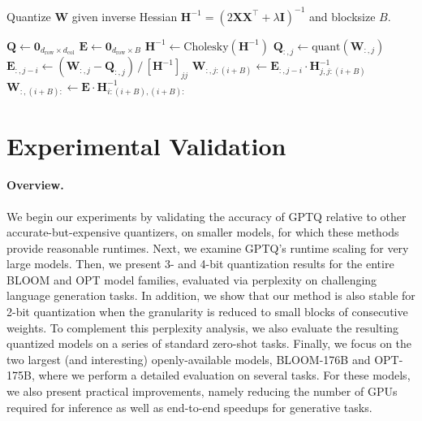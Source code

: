 \begin{algorithm}[H]
    \centering
    \caption{Quantize $\mathbf{W}$ given inverse Hessian $\mathbf{H}^{-1} = (2 \mathbf{X} \mathbf{X}^\top + \lambda \mathbf{I})^{-1}$ and blocksize $B$.}
    \small
    \label{alg:trueobs-row}
    \begin{algorithmic}
        \STATE $\mathbf{Q} \gets \mathbf{0}_{d_\text{row} \times d_\text{col}}$ \quad {}
        \STATE $\mathbf{E} \gets \mathbf{0}_{d_\text{row} \times B}$ \quad {}
        \STATE $\mathbf{H}^{-1} \gets \text{Cholesky}
        (\mathbf{H}^{-1})$ 
                \STATE $\mathbf{Q}_{:, j} \gets \text{quant}(\mathbf{W}_{:, j})$ \quad {}
                \STATE $\mathbf{E}_{:, j - i} \gets (\mathbf{W}_{:, j} - \mathbf{Q}_{:, j}) \, / \, [\mathbf{H}^{-1}]_{jj}$ 
                \STATE $\mathbf{W}_{:, j:(i + B)} \gets \mathbf{E}_{:, j - i} \cdot \mathbf{H}^{-1}_{j, j:(i + B)}$ 
            \ENDFOR
            \STATE $\mathbf{W}_{:, (i + B):} \gets \mathbf{E} \cdot \mathbf{H}^{-1}_{i:(i + B), (i + B):}$ 
        \ENDFOR
    \end{algorithmic}
\end{algorithm}

\section{Experimental Validation}
\label{sec:experiments}

\paragraph{Overview.} We begin our experiments by validating the accuracy of GPTQ relative to other accurate-but-expensive quantizers,  on smaller models, for which these methods provide reasonable runtimes.
Next, we examine GPTQ's runtime scaling for very large models. 
Then, we present 3- and 4-bit quantization results for the entire BLOOM and OPT model families, evaluated via perplexity on challenging language generation tasks. 
In addition, we show that our method is also stable for 2-bit quantization when the granularity is reduced to small blocks of consecutive weights. 
To complement this perplexity analysis, we also evaluate the resulting quantized models on a series of standard zero-shot tasks.
Finally, we focus on the two largest (and interesting) openly-available models, BLOOM-176B and OPT-175B, where we perform a detailed evaluation on several tasks. 
For these models, we also present practical improvements, namely reducing the number of GPUs required for inference as well as end-to-end speedups for generative tasks.

